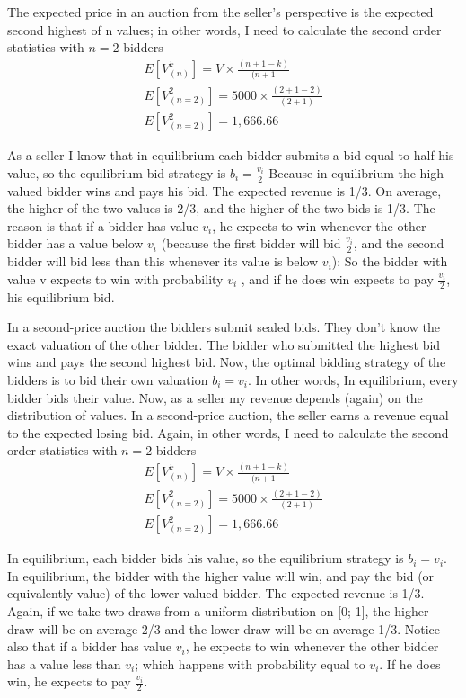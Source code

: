 \documentclass[11pt]{article} %
\begin{document}
The expected price in an auction from the seller’s perspective is the expected second highest of n values; in other words, I need to calculate the second order statistics with $n=2$ bidders
        \begin{align*}
            E[V^{k}_{(n)}] = V \times \frac{(n + 1 -k)}{(n+1} \\
            E[V^{2}_{(n=2)}] = 5000 \times \frac{(2+1-2)}{(2+1)} \\
            E[V^{2}_{(n=2)}] = 1,666.66
        \end{align*}
        
        As a seller I know that in equilibrium each bidder submits a bid equal to half his value, so the equilibrium bid strategy is $b_i = \frac{v_i}{2}$ Because in equilibrium the high-valued bidder wins and pays his bid. The expected revenue is 1/3. On average, the higher of the two values is 2/3, and the higher of the two bids is 1/3. The reason is that if a bidder has value $v_i$, he expects to win whenever the other bidder has a value below $v_i$ (because the first bidder will bid $\frac{v_i}{2}$, and the second bidder will bid less than this whenever its value is below $v_i$): So the bidder with value v expects to win with probability $v_i$ , and if he does win expects to pay $\frac{v_i}{2}$, his equilibrium bid.


In a second-price auction the bidders submit sealed bids. They don’t know the exact valuation of the other bidder. The bidder who submitted the highest bid wins and pays the second highest bid. Now, the optimal bidding strategy of the bidders is to bid their own valuation $b_i = v_i $. In other words, In equilibrium, every bidder bids their value. Now, as a seller my revenue depends (again) on the distribution of values. In a second-price auction, the seller earns a revenue equal to the expected losing bid. Again, in other words, I need to calculate the second order statistics with $n=2$ bidders
        \begin{align*}
            E[V^{k}_{(n)}] = V \times \frac{(n + 1 -k)}{(n+1} \\
            E[V^{2}_{(n=2)}] = 5000 \times \frac{(2+1-2)}{(2+1)} \\
            E[V^{2}_{(n=2)}] = 1,666.66
        \end{align*}

        In equilibrium, each bidder bids his value, so the equilibrium strategy is $b_i = v_i $. In equilibrium, the bidder with the higher value will win, and pay the bid (or equivalently value) of the lower-valued bidder. The expected revenue is 1/3. Again, if we take two draws from a uniform distribution on [0; 1], the higher draw will be on average 2/3 and the lower draw will be on average 1/3. Notice also that if a bidder has value $v_i$, he expects to win whenever the other bidder has a value less than $v_i$; which happens with probability equal to $v_i$. If he does win, he expects to pay $\frac{v_i}{2}$. \\
        
\end{document}
